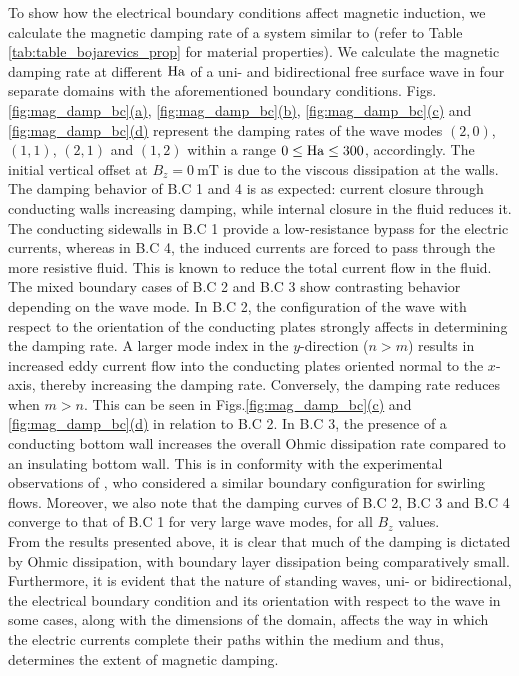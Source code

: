 \documentclass[aps,prfluids,reprint,superscriptaddress]{revtex4-2}
\newcommand{\subref}[2]{\ref{#1}\hyperref[#1]{(#2)}}
\begin{document}
To show how the electrical boundary conditions affect magnetic induction, we calculate the magnetic damping rate of a system similar to \citet{Bojarevics2006a} (refer to Table\,\ref{tab:table_bojarevics_prop} for material properties). We calculate the magnetic damping rate at different $\rm Ha$ of a uni- and bidirectional free surface wave in four separate domains with the aforementioned boundary conditions. Figs.\,\subref{fig:mag_damp_bc}{a}, \subref{fig:mag_damp_bc}{b}, \subref{fig:mag_damp_bc}{c} and \subref{fig:mag_damp_bc}{d} represent the damping rates of the wave modes $(2,0)$, $(1,1)$, $(2,1)$ and $(1,2)$ within a range $0\leq \rm Ha \leq 300$, accordingly. 
The initial vertical offset at $B_z=\SI{0}{\milli\tesla}$ is due to the viscous dissipation at the walls. The damping behavior of B.C 1 and 4 is as expected: current closure through conducting walls increasing damping, while internal closure in the fluid reduces it. The conducting sidewalls in B.C 1 provide a low-resistance bypass for the electric currents, whereas in B.C 4, the induced currents are forced to pass through the more resistive fluid. This is known to reduce the total current flow in the fluid. The mixed boundary cases of B.C 2 and B.C 3 show contrasting behavior depending on the wave mode. In B.C 2, the configuration of the wave with respect to the orientation of the conducting plates strongly affects in determining the damping rate. A larger mode index in the $y$-direction ($n\!>\!m$) results in increased eddy current flow into the conducting plates oriented normal to the $x$-axis, thereby increasing the damping rate. Conversely, the damping rate reduces when $m\!>\!n$. This can be seen in Figs.\subref{fig:mag_damp_bc}{c} and \subref{fig:mag_damp_bc}{d} in relation to B.C 2. In B.C 3, the presence of a conducting bottom wall increases the overall Ohmic dissipation rate compared to an insulating bottom wall. This is in conformity with the experimental observations of \citet{Dominguez2017}, who considered a similar boundary configuration for swirling flows. Moreover, we also note that the damping curves of B.C 2, B.C 3 and B.C 4 converge to that of B.C 1 for very large wave modes, for all $B_z$ values.  
\\
\indent From the results presented above, it is clear that much of the damping is dictated by Ohmic dissipation, with boundary layer dissipation being comparatively small. Furthermore, it is evident that the nature of standing waves, uni- or bidirectional, the electrical boundary condition and its orientation with respect to the wave in some cases, along with the dimensions of the domain, affects the way in which the electric currents complete their paths within the medium and thus, determines the extent of magnetic damping.  
\end{document}
